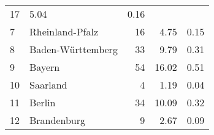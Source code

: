\begin{longtable}{lXrrr}
       \num{17} &
       \num[round-mode=places,round-precision=2]{5,04} &
         \num[round-mode=places,round-precision=2]{0,16} \\

     7 &
     \multicolumn{1}{X}{ Rheinland-Pfalz   } &


       \num{16} &
       \num[round-mode=places,round-precision=2]{4,75} &
         \num[round-mode=places,round-precision=2]{0,15} \\

     8 &
     \multicolumn{1}{X}{ Baden-Württemberg   } &


       \num{33} &
       \num[round-mode=places,round-precision=2]{9,79} &
         \num[round-mode=places,round-precision=2]{0,31} \\

     9 &
     \multicolumn{1}{X}{ Bayern   } &


       \num{54} &
       \num[round-mode=places,round-precision=2]{16,02} &
         \num[round-mode=places,round-precision=2]{0,51} \\

     10 &
     \multicolumn{1}{X}{ Saarland   } &


       \num{4} &
       \num[round-mode=places,round-precision=2]{1,19} &
         \num[round-mode=places,round-precision=2]{0,04} \\

     11 &
     \multicolumn{1}{X}{ Berlin   } &


       \num{34} &
       \num[round-mode=places,round-precision=2]{10,09} &
         \num[round-mode=places,round-precision=2]{0,32} \\

     12 &
     \multicolumn{1}{X}{ Brandenburg   } &


       \num{9} &
       \num[round-mode=places,round-precision=2]{2,67} &
         \num[round-mode=places,round-precision=2]{0,09} \\


\end{longtable}
